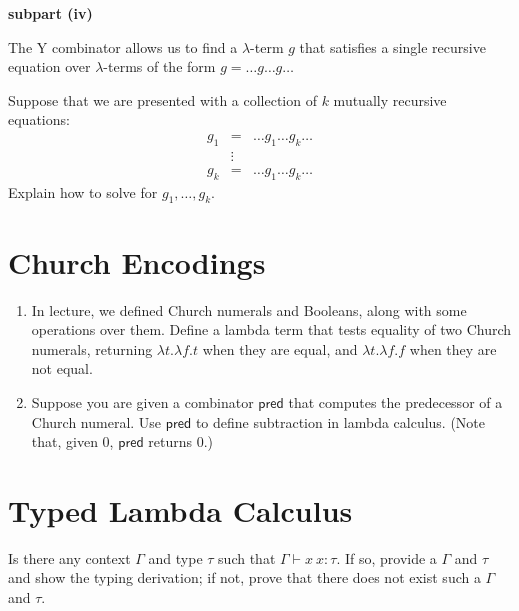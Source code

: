 \documentclass[11pt, oneside]{article}   	%
\begin{document}
\begin{enumerate}[label=\bf\Alph*]
\noindent
{\bf subpart (iv)}

The Y combinator
allows us to find a $\lambda$-term $g$
that satisfies a single recursive equation over $\lambda$-terms of the
form $g = \ldots g \ldots g \ldots$

Suppose that we are presented with a collection of $k$ mutually recursive
equations:
\[
  \begin{array}{rcl}
    g_1 & = & \ldots g_1 \ldots g_k \ldots \\
        & \vdots & \\
    g_k & = & \ldots g_1 \ldots g_k \ldots
  \end{array}
\]
Explain how to solve for $g_1, \ldots, g_k$.


\end{enumerate}

\section{Church Encodings}
\begin{enumerate}[label=\bf\Alph*]
  \item In lecture, we defined Church numerals and Booleans, along with some  operations over them.
Define a lambda term that tests equality of two Church numerals,
returning $\lambda t. \lambda f. t$ when they are equal,
and $\lambda t. \lambda f. f$ when they are not equal.

\item Suppose you are given a combinator $\textsf{pred}$
that computes the predecessor of a Church numeral.
Use $\textsf{pred}$ to define subtraction in lambda calculus.
(Note that, given 0, $\textsf{pred}$ returns 0.)
\end{enumerate}

\section{Typed Lambda Calculus}
   Is there any context $\Gamma$ and type $\tau$
  such that $\Gamma \vdash x\ x : \tau$. If so,
  provide a $\Gamma$ and $\tau$ and show the typing derivation;
  if not, prove that there does not exist
  such a $\Gamma$ and $\tau$.
\end{document}

